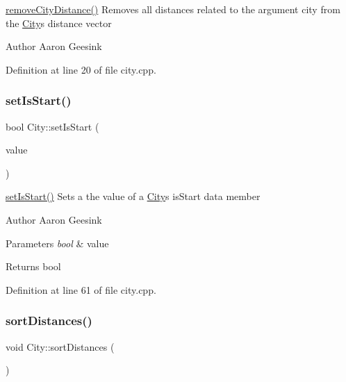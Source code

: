 \mbox{\hyperlink{class_city_ac4829f9fc09b4c0f4cf2f7453c974264}{remove\+City\+Distance()}} Removes all distances related to the argument city from the \mbox{\hyperlink{class_city}{City}}\textquotesingle{}s distance vector 

\begin{DoxyAuthor}{Author}
Aaron Geesink 
\end{DoxyAuthor}


Definition at line 20 of file city.\+cpp.

\mbox{\label{class_city_a9fcdb0c59ac7760dd3996803ddb6bf86}} 
\subsubsection{\texorpdfstring{setIsStart()}{setIsStart()}}
{\footnotesize\ttfamily bool City\+::set\+Is\+Start (\begin{DoxyParamCaption}\item[{bool}]{value }\end{DoxyParamCaption})}



\mbox{\hyperlink{class_city_a9fcdb0c59ac7760dd3996803ddb6bf86}{set\+Is\+Start()}} Sets a the value of a \mbox{\hyperlink{class_city}{City}}\textquotesingle{}s is\+Start data member 

\begin{DoxyAuthor}{Author}
Aaron Geesink 
\end{DoxyAuthor}

\begin{DoxyParams}{Parameters}
{\em bool} & value \\
\hline
\end{DoxyParams}
\begin{DoxyReturn}{Returns}
bool 
\end{DoxyReturn}


Definition at line 61 of file city.\+cpp.

\mbox{\label{class_city_a9e3da459f9dcf61ae1a4551d79abafb8}} 
\subsubsection{\texorpdfstring{sortDistances()}{sortDistances()}}
{\footnotesize\ttfamily void City\+::sort\+Distances (\begin{DoxyParamCaption}{ }\end{DoxyParamCaption})}



